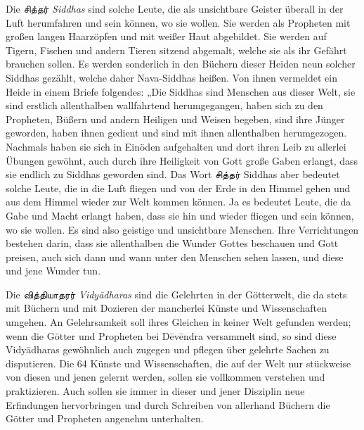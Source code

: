 \documentclass{article}
\newcommand{\TamilText}[1]{\texttamil{#1}}
\newcommand{\tam}[1]{\TamilText{#1}}
\begin{document}
Die \tam{சித்தர்} \emph{Siddhas} sind solche Leute, die als unsichtbare Geister überall in der Luft herumfahren und sein können, wo sie wollen. Sie werden als Propheten mit großen langen Haarzöpfen und mit weißer Haut abgebildet. Sie werden auf Tigern, Fischen und andern Tieren sitzend abgemalt, welche sie als ihr Gefährt brauchen sollen. Es werden sonderlich in den Büchern dieser Heiden neun solcher Siddhas gezählt, welche daher Nava-Siddhas heißen. Von ihnen vermeldet ein Heide in einem Briefe folgendes: „Die Siddhas sind Menschen aus dieser Welt, sie sind erstlich allenthalben wallfahrtend herumgegangen, haben sich zu den Propheten, Büßern und andern Heiligen und Weisen begeben, sind ihre Jünger geworden, haben ihnen gedient und sind mit ihnen allenthalben herumgezogen. Nachmals haben sie sich in Einöden aufgehalten und dort ihren Leib zu allerlei Übungen gewöhnt, auch durch ihre Heiligkeit von Gott große Gaben erlangt, dass sie endlich zu Siddhas geworden sind. Das Wort \tam{சித்தர்} Siddhas aber bedeutet solche Leute, die in die Luft fliegen und von der Erde in den Himmel gehen und aus dem Himmel wieder zur Welt kommen können. Ja es bedeutet Leute, die da Gabe und Macht erlangt haben, dass sie hin und wieder fliegen und sein können, wo sie wollen. Es sind also geistige und unsichtbare Menschen. Ihre Verrichtungen bestehen darin, dass sie allenthalben die Wunder Gottes beschauen und Gott preisen, auch sich dann und wann unter den Menschen sehen lassen, und diese und jene Wunder tun.

Die \tam{வித்தியாதரர்} \emph{Vidy\={a}dharas} sind die Gelehrten in der Götterwelt, die da stets mit Büchern und mit Dozieren der mancherlei Künste und Wissenschaften umgehen. An Gelehrsamkeit soll ihres Gleichen in keiner Welt gefunden werden; wenn die Götter und Propheten bei D\={e}v\={e}ndra versammelt sind, so sind diese Vidy\={a}dharas gewöhnlich auch zugegen und pflegen über gelehrte Sachen zu disputieren. Die 64 Künste und Wissenschaften, die auf der Welt nur stückweise von diesen und jenen gelernt werden, sollen sie vollkommen verstehen und praktizieren. Auch sollen sie immer in dieser und jener Disziplin neue Erfindungen hervorbringen und durch Schreiben von allerhand Büchern die Götter und Propheten angenehm unterhalten.
\end{document}
